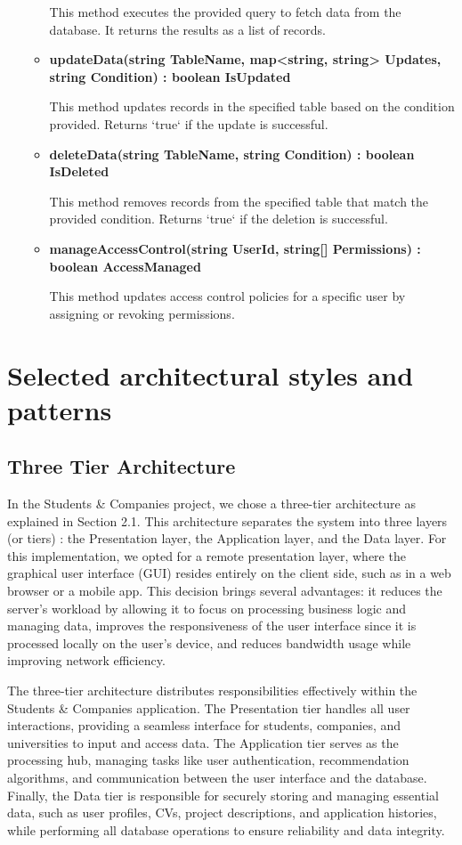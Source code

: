 \begin{itemize}
\begin{itemize}
This method executes the provided query to fetch data from the database. It returns the results as a list of records.

\item \textbf{updateData(string TableName, map<string, string> Updates, string Condition) : boolean IsUpdated}

This method updates records in the specified table based on the condition provided. Returns `true` if the update is successful.

\item \textbf{deleteData(string TableName, string Condition) : boolean IsDeleted}  

This method removes records from the specified table that match the provided condition. Returns `true` if the deletion is successful.

\item \textbf{manageAccessControl(string UserId, string[] Permissions) : boolean AccessManaged}  

This method updates access control policies for a specific user by assigning or revoking permissions.

\end{itemize}
\end{itemize}


\pagebreak
\section{Selected architectural styles and patterns}

\subsection{Three Tier Architecture}
In the Students \& Companies project, we chose a three-tier architecture as explained in Section 2.1. This architecture separates the system into three layers (or tiers) : the Presentation layer, the Application layer, and the Data layer. For this implementation, we opted for a remote presentation layer, where the graphical user interface (GUI) resides entirely on the client side, such as in a web browser or a mobile app. This decision brings several advantages: it reduces the server's workload by allowing it to focus on processing business logic and managing data, improves the responsiveness of the user interface since it is processed locally on the user’s device, and reduces bandwidth usage while improving network efficiency.

The three-tier architecture distributes responsibilities effectively within the Students \& Companies application. The Presentation tier handles all user interactions, providing a seamless interface for students, companies, and universities to input and access data. The Application tier serves as the processing hub, managing tasks like user authentication, recommendation algorithms, and communication between the user interface and the database. Finally, the Data tier is responsible for securely storing and managing essential data, such as user profiles, CVs, project descriptions, and application histories, while performing all database operations to ensure reliability and data integrity.

